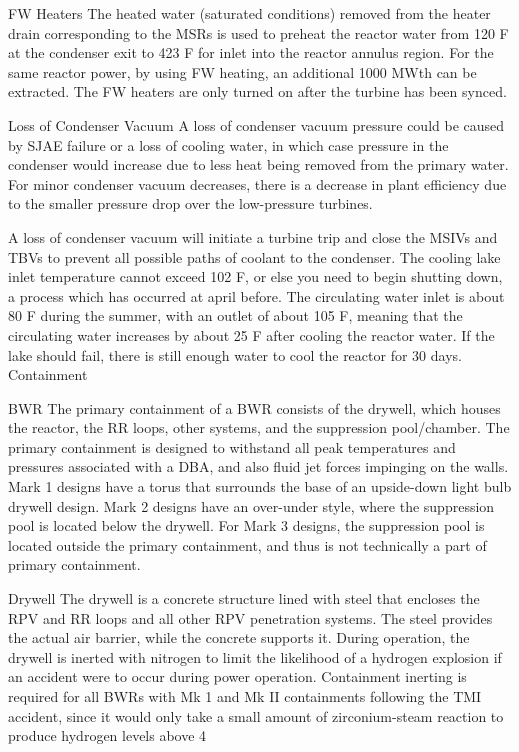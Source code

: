 \documentclass[10pt]{article}
\begin{document}
FW Heaters
The heated water (saturated conditions) removed from the heater drain corresponding to the MSRs is used to preheat the reactor water from 120 F at the condenser exit to 423 F for inlet into the reactor annulus region. For the same reactor power, by using FW heating, an additional 1000 MWth can be extracted. The FW heaters are only turned on after the turbine has been synced. 

Loss of Condenser Vacuum
A loss of condenser vacuum pressure could be caused by SJAE failure or a loss of cooling water, in which case pressure in the condenser would increase due to less heat being removed from the primary water. For minor condenser vacuum decreases, there is a decrease in plant efficiency due to the smaller pressure drop over the low-pressure turbines. 

A loss of condenser vacuum will initiate a turbine trip and close the MSIVs and TBVs to prevent all possible paths of coolant to the condenser. The cooling lake inlet temperature cannot exceed 102 F, or else you need to begin shutting down, a process which has occurred at april before. The circulating water inlet is about 80 F during the summer, with an outlet of about 105 F, meaning that the circulating water increases by about 25 F after cooling the reactor water. If the lake should fail, there is still enough water to cool the reactor for 30 days. 

Containment

BWR
The primary containment of a BWR consists of the drywell, which houses the reactor, the RR loops, other systems, and the suppression pool/chamber. The primary containment is designed to withstand all peak temperatures and pressures associated with a DBA, and also fluid jet forces impinging on the walls. Mark 1 designs have a torus that surrounds the base of an upside-down light bulb drywell design. Mark 2 designs have an over-under style, where the suppression pool is located below the drywell.  For Mark 3 designs, the suppression pool is located outside the primary containment, and thus is not technically a part of primary containment. 

Drywell
The drywell is a concrete structure lined with steel that encloses the RPV and RR loops and all other RPV penetration systems. The steel provides the actual air barrier, while the concrete supports it. During operation, the drywell is inerted with nitrogen to limit the likelihood of a hydrogen explosion if an accident were to occur during power operation. Containment inerting is required for all BWRs with Mk 1 and Mk II containments following the TMI accident, since it would only take a small amount of zirconium-steam reaction to produce hydrogen levels above 4%
\end{document}
